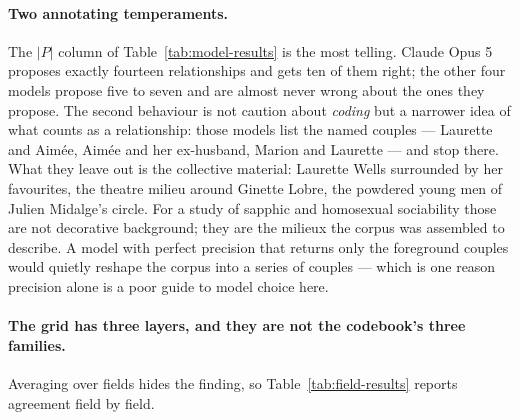 \paragraph{Two annotating temperaments.} The $|P|$ column of
Table~\ref{tab:model-results} is the most telling. Claude Opus 5 proposes exactly
fourteen relationships and gets ten of them right; the other four models propose five
to seven and are almost never wrong about the ones they propose. The second behaviour
is not caution about \emph{coding} but a narrower idea of what counts as a
relationship: those models list the named couples --- Laurette and Aimée, Aimée and
her ex-husband, Marion and Laurette --- and stop there. What they leave out is the
collective material: Laurette Wells surrounded by her favourites, the theatre milieu
around Ginette Lobre, the powdered young men of Julien Midalge's circle. For a study
of sapphic and homosexual sociability those are not decorative background; they are
the milieux the corpus was assembled to describe. A model with perfect precision that
returns only the foreground couples would quietly reshape the corpus into a series of
couples --- which is one reason precision alone is a poor guide to model choice here.

\paragraph{The grid has three layers, and they are not the codebook's three
families.} Averaging over fields hides the finding, so Table~\ref{tab:field-results}
reports agreement field by field.


